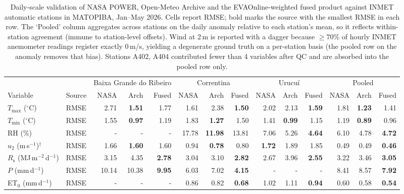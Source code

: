 \begin{table}[t]
\centering
\caption{Daily-scale validation of NASA POWER, Open-Meteo Archive and the EVAOnline-weighted fused product against INMET automatic stations in MATOPIBA, Jan--May 2026. Cells report RMSE; bold marks the source with the smallest RMSE in each row. The `Pooled' column aggregates across stations on the daily anomaly relative to each station's mean, so it reflects within-station agreement (immune to station-level offsets). Wind at 2\,m is reported with a dagger because $\geq70\%$ of hourly INMET anemometer readings register exactly $0$\,m/s, yielding a degenerate ground truth on a per-station basis (the pooled row on the anomaly removes that bias). Stations A402, A404 contributed fewer than 4 variables after QC and are absorbed into the pooled row only.}
\label{tab:inmet-validation}
\begin{tabular}{llrrrrrrrrrrrr}
\toprule
& & \multicolumn{3}{c}{Baixa Grande do Ribeiro} & \multicolumn{3}{c}{Correntina} & \multicolumn{3}{c}{Urucuí} & \multicolumn{3}{c}{Pooled} \\
\cmidrule(lr){3-11} \cmidrule(lr){12-14}
Variable & Source & NASA & Arch & Fused & NASA & Arch & Fused & NASA & Arch & Fused & NASA & Arch & Fused \\
\midrule
$T_\mathrm{max}$ ($^\circ$C) & RMSE & 2.71 & \textbf{1.51} & 1.77 & 1.61 & 2.38 & \textbf{1.50} & 2.02 & 2.13 & \textbf{1.59} & 1.81 & \textbf{1.23} & 1.41 \\
$T_\mathrm{min}$ ($^\circ$C) & RMSE & 1.55 & \textbf{0.97} & 1.19 & 1.83 & \textbf{1.27} & 1.50 & 1.41 & \textbf{0.99} & 1.15 & 1.19 & \textbf{0.89} & 0.96 \\
RH (\%) & RMSE & - & - & - & 17.78 & \textbf{11.98} & 13.81 & 7.06 & 5.26 & \textbf{4.64} & 6.10 & 4.78 & \textbf{4.72} \\
$u_2$ (m\,s$^{-1}$)$^\dagger$ & RMSE & 1.66 & \textbf{1.60} & 1.60 & 0.94 & \textbf{0.78} & 0.80 & \textbf{1.72} & 1.89 & 1.85 & 0.49 & 0.49 & \textbf{0.46} \\
$R_\mathrm{s}$ (MJ\,m$^{-2}$\,d$^{-1}$) & RMSE & 3.15 & 4.35 & \textbf{2.78} & 3.04 & 3.10 & \textbf{2.82} & 2.67 & 3.96 & \textbf{2.55} & 3.22 & 3.46 & \textbf{3.05} \\
$P$ (mm\,d$^{-1}$) & RMSE & 10.14 & 10.38 & \textbf{9.95} & 6.03 & 7.02 & \textbf{4.15} & - & - & - & 8.41 & 8.57 & \textbf{7.92} \\
ET$_0$ (mm\,d$^{-1}$) & RMSE & - & - & - & 0.86 & 0.82 & \textbf{0.68} & 1.02 & 1.11 & \textbf{0.94} & 0.60 & 0.58 & \textbf{0.54} \\
\bottomrule
\end{tabular}
\end{table}